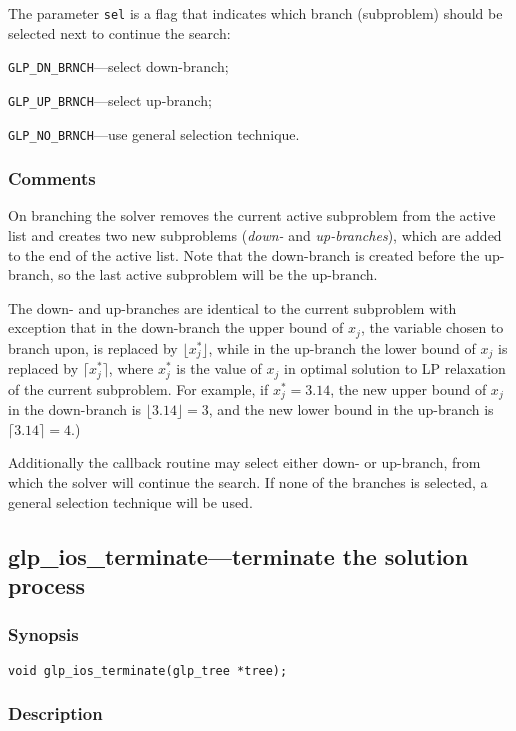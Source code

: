 The parameter \verb|sel| is a flag that indicates which branch
(subproblem) should be selected next to continue the search:

\verb|GLP_DN_BRNCH|---select down-branch;

\verb|GLP_UP_BRNCH|---select up-branch;

\verb|GLP_NO_BRNCH|---use general selection technique.

\subsubsection*{Comments}

On branching the solver removes the current active subproblem from the
active list and creates two new subproblems ({\it down-} and {\it
up-branches}), which are added to the end of the active list. Note that
the down-branch is created before the up-branch, so the last active
subproblem will be the up-branch.

The down- and up-branches are identical to the current subproblem with
exception that in the down-branch the upper bound of $x_j$, the variable
chosen to branch upon, is replaced by $\lfloor x_j^*\rfloor$, while in
the up-branch the lower bound of $x_j$ is replaced by
$\lceil x_j^*\rceil$, where $x_j^*$ is the value of $x_j$ in optimal
solution to LP relaxation of the current subproblem. For example, if
$x_j^*=3.14$, the new upper bound of $x_j$ in the down-branch is
$\lfloor 3.14\rfloor=3$, and the new lower bound in the up-branch is
$\lceil 3.14\rceil=4$.)

Additionally the callback routine may select either down- or up-branch,
from which the solver will continue the search. If none of the branches
is selected, a general selection technique will be used.

\newpage

\subsection{glp\_ios\_terminate---terminate the solution process}

\subsubsection*{Synopsis}

\begin{verbatim}
void glp_ios_terminate(glp_tree *tree);
\end{verbatim}

\subsubsection*{Description}

